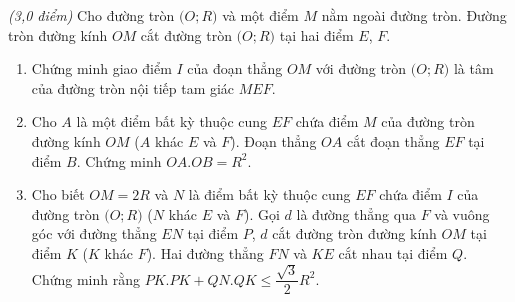 \begin{ex}{\it{(3,0 điểm)}}%
Cho đường tròn $\big(O; R\big)$ và một điểm $M$ nằm ngoài đường tròn. Đường tròn đường kính $OM$ cắt đường tròn $\big(O; R\big)$ tại hai điểm $E$, $F$.
\begin{enumerate}	
\item Chứng minh giao điểm $I$ của đoạn thẳng $OM$ với đường tròn $\big(O; R\big)$ là tâm của đường tròn nội tiếp tam giác $MEF$. 
\item  Cho $A$ là một điểm bất kỳ thuộc cung $EF$ chứa điểm $M$ của đường tròn đường kính $OM$ ($A$ khác $E$ và $F$). Đoạn thẳng $OA$ cắt đoạn thẳng $EF$ tại điểm $B$. Chứng minh $OA.OB = R^2$. 
\item Cho biết $OM = 2R$ và $N$ là điểm bất kỳ thuộc cung $EF$ chứa điểm $I$ của đường tròn $\big(O; R\big)$ ($N$ khác $E$ và $F$).  Gọi $d$ là đường thẳng qua $F$ và vuông góc với đường thẳng $EN$ tại điểm $P$, $d$ cắt đường tròn đường kính $OM$ tại điểm $K$ ($K$ khác $F$). Hai đường thẳng $FN$ và $KE$ cắt nhau tại điểm $Q$. 
Chứng minh rằng $PK.PK + QN.QK \leq \dfrac{\sqrt{3}}{2}R^2$.
\end{enumerate}
\end{ex}
